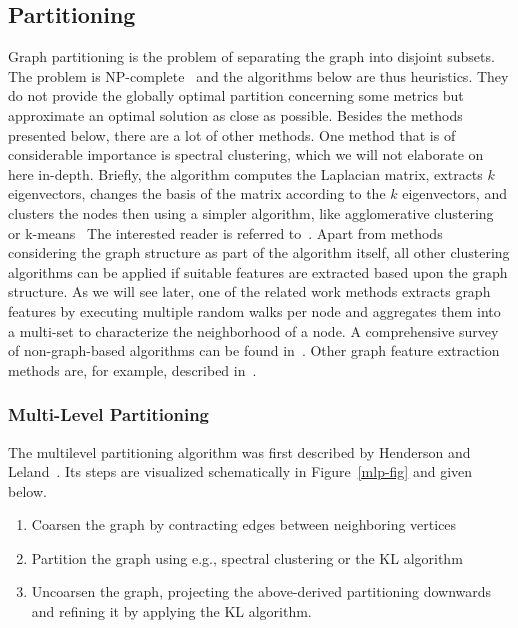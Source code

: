         \subsection{Partitioning} 
            Graph partitioning is the problem of separating the graph into disjoint subsets. 
            The problem is NP-complete~\autocite{andreev2006balanced} and the algorithms below are thus heuristics.
            They do not provide the globally optimal partition concerning some metrics but approximate an optimal solution as close as possible.
            Besides the methods presented below, there are a lot of other methods.
            One method that is of considerable importance is spectral clustering, which we will not elaborate on here in-depth.
            Briefly, the algorithm computes the Laplacian matrix, extracts $k$ eigenvectors, changes the basis of the matrix according to the $k$ eigenvectors, and clusters the nodes then using a simpler algorithm, like agglomerative clustering~\autocite{hac} or k-means~\autocite{lloyd1982least}
            The interested reader is referred to~\autocite{spectral, uvl, ng}.
            Apart from methods considering the graph structure as part of the algorithm itself, all other clustering algorithms can be applied if suitable features are extracted based upon the graph structure.
            As we will see later, one of the related work methods extracts graph features by executing multiple random walks per node and aggregates them into a multi-set to characterize the neighborhood of a node.
            A comprehensive survey of non-graph-based algorithms can be found in~\autocite{overview_clust, berkhin2006survey, xu2005survey, han2011data}.
            Other graph feature extraction methods are, for example, described in~\autocite{neumann2011characteristic, henderson2011s, henderson2012rolx}.
            
            
            
            \subsubsection*{Multi-Level Partitioning}\label{mlp}
                The multilevel partitioning algorithm was first described by Henderson and Leland~\autocite{hendrickson1995multi}. 
                Its steps are visualized schematically in Figure~\ref{mlp-fig} and given below.
                \begin{enumerate}
                    \item Coarsen the graph by contracting edges between neighboring vertices
                    \item Partition the graph using e.g., spectral clustering or the KL algorithm
                    \item Uncoarsen the graph, projecting the above-derived partitioning downwards and refining it by applying the KL algorithm.
                \end{enumerate}
                
